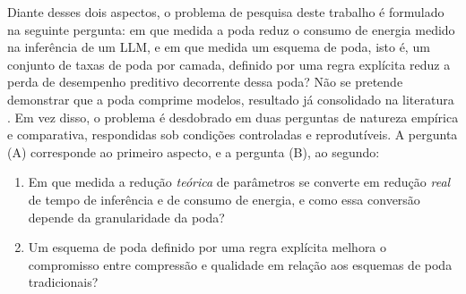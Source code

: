 Diante desses dois aspectos, o problema de pesquisa deste trabalho é formulado na seguinte
pergunta: em que medida a poda reduz o consumo de energia medido na inferência de um LLM, e em
que medida um esquema de poda, isto é, um conjunto de taxas de poda por camada, definido por
uma regra explícita reduz a perda de desempenho preditivo decorrente dessa poda? Não se pretende demonstrar que a poda comprime modelos, resultado já consolidado na
literatura \cite{Blalock2020}. Em vez disso, o problema é desdobrado em duas perguntas de
natureza empírica e comparativa, respondidas sob condições controladas e reprodutíveis. A
pergunta (A) corresponde ao primeiro aspecto, e a pergunta (B), ao segundo:

\begin{enumerate}
    \item[(A)] Em que medida a redução \textit{teórica} de parâmetros se converte em
          redução \textit{real} de tempo de inferência e de consumo de energia, e como
          essa conversão depende da granularidade da poda?
    \item[(B)] Um esquema de poda definido por uma regra explícita melhora o compromisso entre
          compressão e qualidade em relação aos esquemas de poda tradicionais?
\end{enumerate}

